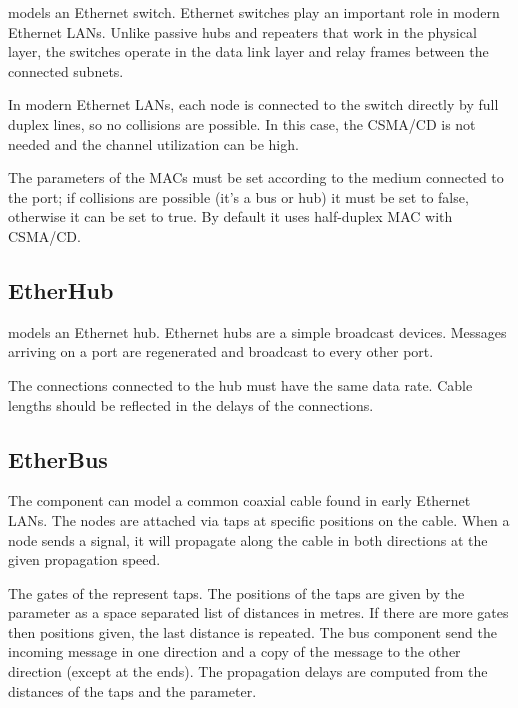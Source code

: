  models an Ethernet switch. Ethernet switches play an
important role in modern Ethernet LANs. Unlike passive hubs and repeaters that
work in the physical layer, the switches operate in the data link layer and
relay frames between the connected subnets.

In modern Ethernet LANs, each node is connected to the switch directly by full
duplex lines, so no collisions are possible. In this case, the CSMA/CD is not
needed and the channel utilization can be high.

The  parameters of the MACs must be set according to the
medium connected to the port; if collisions are possible (it's a bus or hub)
it must be set to false, otherwise it can be set to true.
By default it uses half-duplex MAC with CSMA/CD.

\subsection{EtherHub}
\label{sec:ethernet:etherhub}

 models an Ethernet hub. Ethernet hubs are a simple broadcast
devices. Messages arriving on a port are regenerated and broadcast to every
other port.

The connections connected to the hub must have the same data rate.
Cable lengths should be reflected in the delays of the connections.


\subsection{EtherBus}
\label{sec:ethernet:etherbus}

The  component can model a common coaxial cable
found in early Ethernet LANs. The nodes are attached via taps at specific
positions on the cable. When a node sends a signal, it will propagate
along the cable in both directions at the given propagation speed.

The gates of the  represent taps. The positions
of the taps are given by the  parameter as a
space separated list of distances in metres. If there are more
gates then positions given, the last distance is repeated.
The bus component send the incoming message in one direction and
a copy of the message to the other direction (except at the ends).
The propagation delays are computed from the distances of the taps
and the  parameter.


